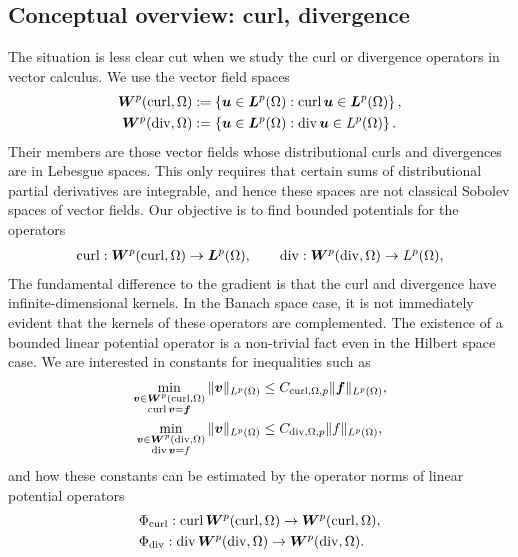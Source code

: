 \documentclass[10pt,a4paper]{article}
\begin{document}
\subsection{Conceptual overview: curl, divergence}

The situation is less clear cut when we study the curl or divergence operators in vector calculus.
We use the vector field spaces
\begin{align*}
    \bm{W}^{p}(\operatorname{curl},\Omega) &:= \left\{ \bm{u} \in \bm{L}^{p}(\Omega) : \operatorname{curl} \bm{u} \in \bm{L}^{p}(\Omega) \right\}
    ,
    \\
    \bm{W}^{p}(\operatorname{div},\Omega) &:= \left\{ \bm{u} \in \bm{L}^{p}(\Omega) : \operatorname{div} \bm{u} \in L^{p}(\Omega) \right\}
    .
\end{align*}
Their members are those vector fields whose distributional curls and divergences are in Lebesgue spaces. 
This only requires that certain sums of distributional partial derivatives are integrable, 
and hence these spaces are not classical Sobolev spaces of vector fields. 
Our objective is to find bounded potentials for the operators 
\begin{align*}
    \operatorname{curl} : \bm{W}^{p}(\operatorname{curl},\Omega) \rightarrow \bm{L}^{p}(\Omega),
    \qquad 
    \operatorname{div} : \bm{W}^{p}(\operatorname{div},\Omega) \rightarrow L^{p}(\Omega),
\end{align*}
The fundamental difference to the gradient is that the curl and divergence have infinite-dimensional kernels. 
In the Banach space case, it is not immediately evident that the kernels of these operators are complemented.
The existence of a bounded linear potential operator is a non-trivial fact even in the Hilbert space case.
We are interested in constants for inequalities such as 
\begin{align*}
    \min\limits_{ \substack{ \bfv \in \bfW^{p}(\curl,\Omega) \\ \curl \bfv = \bff } } 
    \| \bfv \|_{L^{p}(\Omega)}
    &\leq 
    C_{\curl,\Omega,p}
    \| \bff \|_{L^{p}(\Omega)}
    ,
    \\%
    \min\limits_{ \substack{ \bfv \in \bfW^{p}(\divergence,\Omega) \\ \divergence \bfv = f } } 
    \| \bfv \|_{L^{p}(\Omega)}
    &\leq 
    C_{\divergence,\Omega,p}
    \| f \|_{L^{p}(\Omega)}
    ,
\end{align*}
and how these constants can be estimated by the operator norms of linear potential operators 
\begin{align*}
    &\Phi_{\operatorname{curl}} : \operatorname{curl} \bm{W}^{p}(\operatorname{curl},\Omega) \rightarrow \bm{W}^{p}(\operatorname{curl},\Omega)
    ,
    \\
    &\Phi_{\operatorname{div}} : \operatorname{div} \bm{W}^{p}(\operatorname{div},\Omega) \rightarrow \bm{W}^{p}(\operatorname{div},\Omega)
    .
\end{align*}
\end{document}
